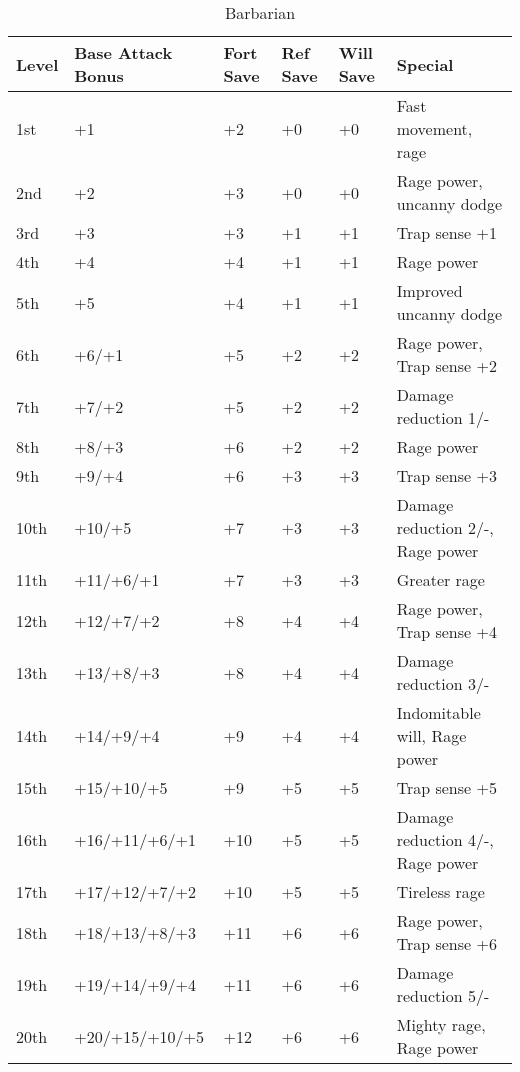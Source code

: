 \begin{table}[]
\caption{Barbarian}
\sffamily
\begin{tabular}{llllll}
Level & Base Attack Bonus & Fort Save & Ref Save & Will Save & Special                          \\
\hline
1st   & +1                & +2        & +0       & +0        & Fast movement, rage              \\
2nd   & +2                & +3        & +0       & +0        & Rage power, uncanny dodge        \\
3rd   & +3                & +3        & +1       & +1        & Trap sense +1                    \\
4th   & +4                & +4        & +1       & +1        & Rage power                       \\
5th   & +5                & +4        & +1       & +1        & Improved uncanny dodge           \\
6th   & +6/+1             & +5        & +2       & +2        & Rage power, Trap sense +2        \\
7th   & +7/+2             & +5        & +2       & +2        & Damage reduction 1/-             \\
8th   & +8/+3             & +6        & +2       & +2        & Rage power                       \\
9th   & +9/+4             & +6        & +3       & +3        & Trap sense +3                    \\
10th  & +10/+5            & +7        & +3       & +3        & Damage reduction 2/-, Rage power \\
11th  & +11/+6/+1         & +7        & +3       & +3        & Greater rage                     \\
12th  & +12/+7/+2         & +8        & +4       & +4        & Rage power, Trap sense +4        \\
13th  & +13/+8/+3         & +8        & +4       & +4        & Damage reduction 3/-             \\
14th  & +14/+9/+4         & +9        & +4       & +4        & Indomitable will, Rage power     \\
15th  & +15/+10/+5        & +9        & +5       & +5        & Trap sense +5                    \\
16th  & +16/+11/+6/+1     & +10       & +5       & +5        & Damage reduction 4/-, Rage power \\
17th  & +17/+12/+7/+2     & +10       & +5       & +5        & Tireless rage                    \\
18th  & +18/+13/+8/+3     & +11       & +6       & +6        & Rage power, Trap sense +6        \\
19th  & +19/+14/+9/+4     & +11       & +6       & +6        & Damage reduction 5/-             \\
20th  & +20/+15/+10/+5    & +12       & +6       & +6        & Mighty rage, Rage power         
\end{tabular}
\end{table}


